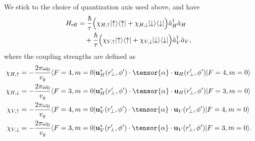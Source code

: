 \documentclass[preprint,aps,pra,onecolumn]{revtex4-1} %
\begin{document}
We stick to the choice of quantization axis used above, and have
\begin{align}
H_{\rm eff} & = \frac{ \hbar }{ \tau}\Big( \chi_{H,\uparrow}\lvert{\uparrow}\rangle\langle{\uparrow}\rvert +  
\chi_{H,\downarrow} \lvert{\downarrow}\rangle\langle{\downarrow}\rvert \Big) \hat{a}_H^\dagger \hat{a}_H \nonumber\\
&\quad +  \frac{ \hbar }{ \tau} \Big( \chi_{V,\uparrow}\lvert{\uparrow}\rangle\langle{\uparrow}\rvert +  \chi_{V,\downarrow} 
\lvert{\downarrow}\rangle\langle{\downarrow}\rvert \Big) \hat{a}_V^\dagger \hat{a}_V  ,
\end{align}
where the coupling strengths are defined as
\begin{align}
\chi_{H,\uparrow} &=  -\frac{2\pi\omega_0}{v_g} \bra{F=4,m=0} 
\mathbf{u}^*_{H}(r^\prime\!\!_\perp,\phi') \cdot\tensor{\alpha}\cdot 
\mathbf{u}_{H}(r^\prime\!\!_\perp,\phi') \ket{F=4,m=0}\\
\chi_{H,\downarrow} &=  -\frac{2\pi\omega_0}{v_g}  \bra{F=3,m=0} 
\mathbf{u}^*_{H}(r^\prime\!\!_\perp,\phi') \cdot\tensor{\alpha}\cdot 
\mathbf{u}_{H}(r^\prime\!\!_\perp,\phi') \ket{F=3,m=0} \\
\chi_{V,\uparrow} &=  -\frac{2\pi\omega_0}{v_g}   \bra{F=4,m=0} 
\mathbf{u}^*_{V}(r^\prime\!\!_\perp,\phi') \cdot\tensor{\alpha}\cdot 
\mathbf{u}_{V}(r^\prime\!\!_\perp,\phi') \ket{F=4,m=0}  \\
\chi_{V,\downarrow} &=  -\frac{2\pi\omega_0}{v_g}  \bra{F=3,m=0} 
\mathbf{u}^*_{V}(r^\prime\!\!_\perp,\phi') \cdot\tensor{\alpha}\cdot 
\mathbf{u}_{V}(r^\prime\!\!_\perp,\phi') \ket{F=3,m=0}. 
\end{align}
\end{document}
